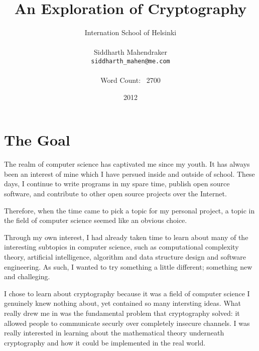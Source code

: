 \documentclass[12pt, a4paper, draft]{report}
\begin{document}
\title{An Exploration of Cryptography}
\author{Internation School of Helsinki\\\\
    Siddharth Mahendraker\\
    \texttt{siddharth\_mahen@me.com}\\\\
    Word Count: ~2700}
\date{2012}
\maketitle

\setcounter{page}{1}
\tableofcontents
\clearpage

\section{The Goal}
\setcounter{page}{1}


The realm of computer science has captivated me since my youth. It has
always been an interest of mine which I have persued inside and outside
of school. These days, I continue to write programs in my spare time,
publish open source software, and contribute to other open source
projects over the Internet.

Therefore, when the time came to pick a topic for my personal project,
a topic in the field of computer science seemed like an obvious choice.

Through my own interest, I had already taken time to learn about many
of the interesting subtopics in computer science, such as computational
complexity theory, artificial intelligence, algorithm and data structure
design and software engineering. As such, I wanted to try something
a little different; something new and challeging.

I chose to learn about cryptography because it was a field of computer
science I genuinely knew nothing about, yet contained so many intersting
ideas. What really drew me in was the fundamental problem that cryptography
solved: it allowed people to communicate securly over completely insecure
channels. I was really interested in learning about the mathematical theory
underneath cryptography and how it could be implemented in the real world.

\end{document}
